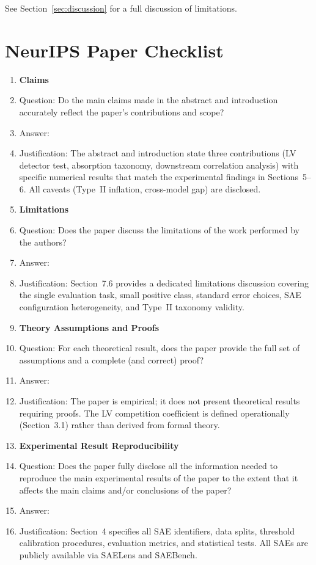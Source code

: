 \documentclass{article}
\begin{document}
See Section~\ref{sec:discussion} for a full discussion of limitations.





\appendix

\section{NeurIPS Paper Checklist}

\begin{enumerate}

\item {\bf Claims}
    \item[] Question: Do the main claims made in the abstract and introduction accurately reflect the paper's contributions and scope?
    \item[] Answer: \answerYes{}
    \item[] Justification: The abstract and introduction state three contributions (LV detector test, absorption taxonomy, downstream correlation analysis) with specific numerical results that match the experimental findings in Sections~5--6. All caveats (Type~II inflation, cross-model gap) are disclosed.

\item {\bf Limitations}
    \item[] Question: Does the paper discuss the limitations of the work performed by the authors?
    \item[] Answer: \answerYes{}
    \item[] Justification: Section~7.6 provides a dedicated limitations discussion covering the single evaluation task, small positive class, standard error choices, SAE configuration heterogeneity, and Type~II taxonomy validity.

\item {\bf Theory Assumptions and Proofs}
    \item[] Question: For each theoretical result, does the paper provide the full set of assumptions and a complete (and correct) proof?
    \item[] Answer: \answerNA{}
    \item[] Justification: The paper is empirical; it does not present theoretical results requiring proofs. The LV competition coefficient is defined operationally (Section~3.1) rather than derived from formal theory.

    \item {\bf Experimental Result Reproducibility}
    \item[] Question: Does the paper fully disclose all the information needed to reproduce the main experimental results of the paper to the extent that it affects the main claims and/or conclusions of the paper?
    \item[] Answer: \answerYes{}
    \item[] Justification: Section~4 specifies all SAE identifiers, data splits, threshold calibration procedures, evaluation metrics, and statistical tests. All SAEs are publicly available via SAELens and SAEBench.


\end{enumerate}
\end{document}
